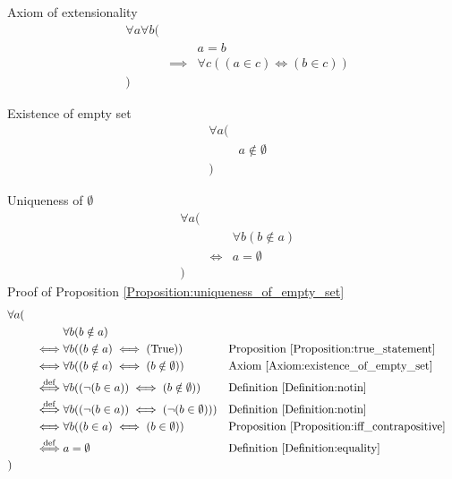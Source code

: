 \begin{axm}
\label{Axiom:extensionality}
Axiom of extensionality
\begin{align*}
& \forall a \forall b ( \\
& & & a = b \\
& & \implies & \forall c ((a \in c) \iff (b \in c)) \\
& )
\end{align*}
\end{axm}

\begin{axm}
\label{Axiom:existence_of_empty_set}
Existence of empty set
\begin{align*}
& \forall a ( \\
& & a \notin \emptyset \\
& )
\end{align*}
\end{axm}

\begin{prop}
\label{Proposition:uniqueness_of_empty_set}
Uniqueness of $\emptyset$
\begin{align*}
& \forall a ( \\
& & & \forall b (b \notin a) \\
& & \iff & a = \emptyset \\
& )
\end{align*}
Proof of Proposition \ref{Proposition:uniqueness_of_empty_set}
\begin{align*}
& \forall a ( \\
& & & \forall b (b \notin a) \\
& & \iff & \forall b ((b \notin a) \iff (\text{True}))
& & \text{Proposition \ref{Proposition:true_statement}} \\
& & \iff & \forall b ((b \notin a) \iff (b \notin \emptyset))
& & \text{Axiom \ref{Axiom:existence_of_empty_set}} \\
& & \overset{\operatorname{def}}{\iff} & \forall b ((\lnot (b \in a)) \iff (b \notin \emptyset))
& & \text{Definition \ref{Definition:notin}} \\
& & \overset{\operatorname{def}}{\iff} & \forall b ((\lnot (b \in a)) \iff (\lnot (b \in \emptyset)))
& & \text{Definition \ref{Definition:notin}} \\
& & \iff & \forall b ((b \in a) \iff (b \in \emptyset))
& & \text{Proposition \ref{Proposition:iff_contrapositive}} \\
& & \overset{\operatorname{def}}{\iff} & a = \emptyset
& & \text{Definition \ref{Definition:equality}} \\
& )
\end{align*}
\end{prop}

